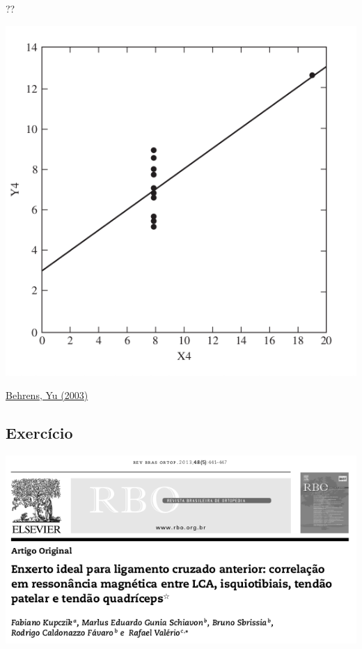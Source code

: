 \documentclass{beamer}
\begin{document}
\begin{frame}{??}
  \begin{center}
    \includegraphics[height=0.7\textheight]{EDA/eda-dispersao4}
  \end{center}

  \vfill
  \scriptsize
  \hfill \href{https://doi.org/10.1002/0471264385.wei0202}
  {Behrens, Yu (2003)}
\end{frame}

\subsection{Exercício}

\begin{frame}
  \begin{center}
    \includegraphics[width=\textwidth]{EDA/eda-exercicio1}
  \end{center}
\end{frame}
\end{document}
